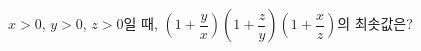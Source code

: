 $x>0$, $y>0$, $z>0$일 때, $\left(1+\dfrac{y}{x}\right)\left(1+\dfrac{z}{y}\right)\left(1+\dfrac{x}{z}\right)$의 최솟값은?

